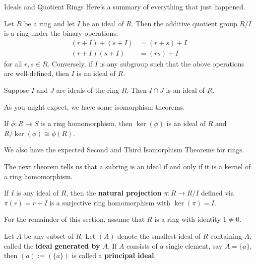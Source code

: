 \begin{section}{Ideals and Quotient Rings}
Here's a summary of everything that just happened.

\begin{theorem}
Let $R$ be a ring and let $I$ be an ideal of $R$.  Then the additive quotient group $R/I$ is a ring under the binary operations:
\begin{align}
(r+I)+(s+I) & =  (r+s)+I\\
(r+I)(s+I) & = (rs)+I
\end{align}
for all $r,s\in R$.  Conversely, if $I$ is any subgroup such that the above operations are well-defined, then $I$ is an ideal of $R$.
\end{theorem}

\begin{theorem}
Suppose $I$ and $J$ are ideals of the ring $R$.  Then $I\cap J$ is an ideal of $R$.
\end{theorem}

As you might expect, we have some isomorphism theorems.

\begin{theorem}
If $\phi:R\to S$ is a ring homomorphism, then $\ker(\phi)$ is an ideal of $R$ and $R/\ker(\phi)\cong \phi(R)$.
\end{theorem}


We also have the expected Second and Third Isomorphism Theorems for rings.  

The next theorem tells us that a subring is an ideal if and only if it is a kernel of a ring homomorphism.

\begin{theorem}
If $I$ is any ideal of $R$, then the \textbf{natural projection} $\pi:R\to R/I$ defined via $\pi(r)=r+I$ is a surjective ring homomorphism with $\ker(\pi)=I$.
\end{theorem}

For the remainder of this section, assume that $R$ is a ring with identity $1\neq 0$.

\begin{definition}
Let $A$ be any subset of $R$. Let $(A)$ denote the smallest ideal of $R$ containing $A$, called the \textbf{ideal generated by $A$}. If $A$ consists of a single element, say $A=\{a\}$, then $(a):=(\{a\})$ is called a \textbf{principal ideal}.
\end{definition}


\end{section}

